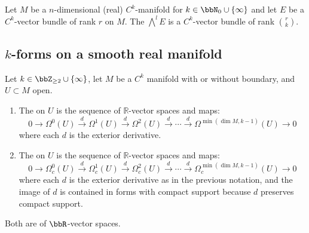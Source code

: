 

\begin{proposition}
    Let $M$ be a $n$-dimensional (real) $C^k$-manifold for $k \in \bbN_0 \cup \{\infty\}$ and let $E$ be a $C^k$-vector bundle of rank $r$ on $M$. The  $\bigwedge^l E$ is a $C^k$-vector bundle of rank ${r\choose k}$.
\end{proposition}

\subsection{\texorpdfstring{$k$}{k}-forms on a smooth real manifold}



% 





\begin{definition}
Let $k \in \bbZ_{\geq 2} \cup \{\infty\}$, let $M$ be a $C^k$ manifold with or without boundary, and $U \subset M$ open. 

\begin{enumerate}
    \item The  on $U$ is the sequence of $\mathbb{R}$-vector spaces and maps:
    $$ 0 \to \Omega^0(U) \xrightarrow{d} \Omega^1(U) \xrightarrow{d} \Omega^2(U) \xrightarrow{d} \cdots \xrightarrow{d} \Omega^{\min(\dim M, k-1)}(U) \to 0 $$
    where each $d$ is the exterior derivative.

    \item The  on $U$ is the sequence of $\mathbb{R}$-vector spaces and maps:
    $$ 0 \to \Omega_c^0(U) \xrightarrow{d} \Omega_c^1(U) \xrightarrow{d} \Omega_c^2(U) \xrightarrow{d} \cdots \xrightarrow{d} \Omega_c^{\min(\dim M, k-1)}(U) \to 0 $$
    where each $d$ is the exterior derivative as in the previous notation, and the image of $d$ is contained in forms with compact support because $d$ preserves compact support.
\end{enumerate}
Both are  of $\bbR$-vector spaces.

\end{definition}



